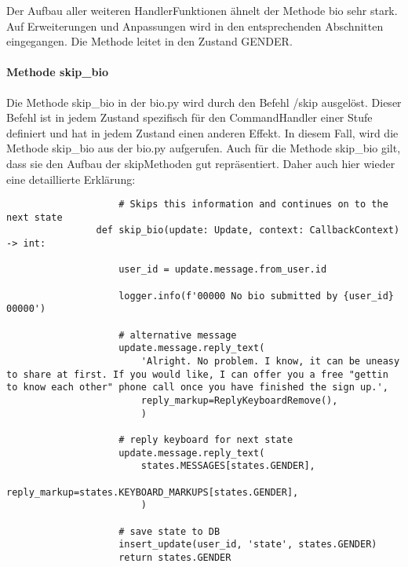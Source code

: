                 Der Aufbau aller weiteren Handler\-Funktionen ähnelt der Methode bio sehr stark. Auf Erweiterungen und Anpassungen wird in den entsprechenden Abschnitten eingegangen. Die Methode leitet in den Zustand GENDER.

            \paragraph{Methode skip\_bio}
                Die Methode skip\_bio in der bio.py wird durch den Befehl /skip ausgelöst. Dieser Befehl ist in jedem Zustand spezifisch für den CommandHandler einer Stufe definiert und hat in jedem Zustand einen anderen Effekt. In diesem Fall, wird die Methode skip\_bio aus der bio.py aufgerufen. Auch für die Methode skip\_bio gilt, dass sie den Aufbau der skip\-Methoden gut repräsentiert. Daher auch hier wieder eine detaillierte Erklärung:\\

                \begin{verbatim}
                    # Skips this information and continues on to the next state
                def skip_bio(update: Update, context: CallbackContext) -> int:
                    
                    user_id = update.message.from_user.id

                    logger.info(f'00000 No bio submitted by {user_id} 00000')

                    # alternative message
                    update.message.reply_text(
                        'Alright. No problem. I know, it can be uneasy to share at first. If you would like, I can offer you a free "gettin to know each other" phone call once you have finished the sign up.',
                        reply_markup=ReplyKeyboardRemove(),
                        )

                    # reply keyboard for next state
                    update.message.reply_text(
                        states.MESSAGES[states.GENDER],
                        reply_markup=states.KEYBOARD_MARKUPS[states.GENDER],
                        )    

                    # save state to DB
                    insert_update(user_id, 'state', states.GENDER)
                    return states.GENDER
                
                \end{verbatim} 

